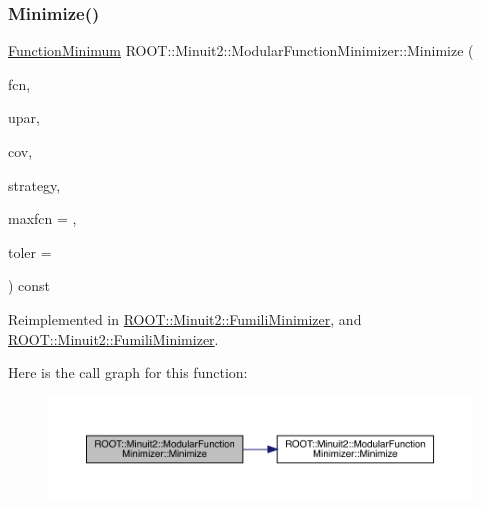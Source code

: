 \subsubsection{\texorpdfstring{Minimize()}{Minimize()}\hspace{0.1cm}{\footnotesize\ttfamily [15/22]}}
{\footnotesize\ttfamily \mbox{\hyperlink{classROOT_1_1Minuit2_1_1FunctionMinimum}{Function\+Minimum}} R\+O\+O\+T\+::\+Minuit2\+::\+Modular\+Function\+Minimizer\+::\+Minimize (\begin{DoxyParamCaption}\item[{const \mbox{\hyperlink{classROOT_1_1Minuit2_1_1FCNGradientBase}{F\+C\+N\+Gradient\+Base}} \&}]{fcn,  }\item[{const \mbox{\hyperlink{classROOT_1_1Minuit2_1_1MnUserParameters}{Mn\+User\+Parameters}} \&}]{upar,  }\item[{const \mbox{\hyperlink{classROOT_1_1Minuit2_1_1MnUserCovariance}{Mn\+User\+Covariance}} \&}]{cov,  }\item[{const \mbox{\hyperlink{classROOT_1_1Minuit2_1_1MnStrategy}{Mn\+Strategy}} \&}]{strategy,  }\item[{unsigned int}]{maxfcn = {},  }\item[{double}]{toler = {} }\end{DoxyParamCaption}) const\hspace{0.3cm}{\ttfamily [virtual]}}



Reimplemented in \mbox{\hyperlink{classROOT_1_1Minuit2_1_1FumiliMinimizer_adb2739d40e10cce1923e5a21dac3f420}{R\+O\+O\+T\+::\+Minuit2\+::\+Fumili\+Minimizer}}, and \mbox{\hyperlink{classROOT_1_1Minuit2_1_1FumiliMinimizer_adb2739d40e10cce1923e5a21dac3f420}{R\+O\+O\+T\+::\+Minuit2\+::\+Fumili\+Minimizer}}.

Here is the call graph for this function\+:\nopagebreak
\begin{figure}[H]
\begin{center}
\leavevmode
\includegraphics[width=350pt]{d3/dc8/classROOT_1_1Minuit2_1_1ModularFunctionMinimizer_afcfe05cabceaab80b036f5b809c6de32_cgraph}
\end{center}
\end{figure}
\mbox{\label{classROOT_1_1Minuit2_1_1ModularFunctionMinimizer_a79a1879062ddd4959716be08c519954e}} 
